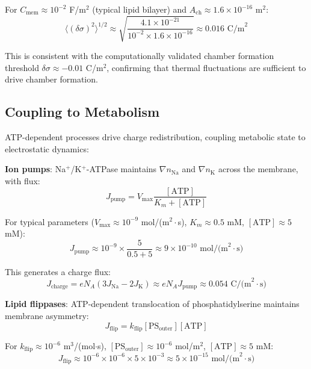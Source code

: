 \documentclass[twocolumn,10pt,aps,prd,superscriptaddress,floatfix,nofootinbib]{revtex4-2}
\theoremstyle{remark}
\begin{document}
For $C_{\mathrm{mem}} \approx 10^{-2}$ F/m$^2$ (typical lipid bilayer) and $A_{\mathrm{ch}} \approx 1.6 \times 10^{-16}$ m$^2$:
\begin{equation}
\langle(\delta\sigma)^2\rangle^{1/2} \approx \sqrt{\frac{4.1 \times 10^{-21}}{10^{-2} \times 1.6 \times 10^{-16}}} \approx 0.016 \text{ C/m}^2
\end{equation}

This is consistent with the computationally validated chamber formation threshold $\delta\sigma \approx -0.01$ C/m$^2$, confirming that thermal fluctuations are sufficient to drive chamber formation.

\subsection{Coupling to Metabolism}

ATP-dependent processes drive charge redistribution, coupling metabolic state to electrostatic dynamics:

\textbf{Ion pumps}: Na$^+$/K$^+$-ATPase maintains $\nabla n_{\mathrm{Na}}$ and $\nabla n_{\mathrm{K}}$ across the membrane, with flux:
\begin{equation}
J_{\mathrm{pump}} = V_{\mathrm{max}}\frac{[\mathrm{ATP}]}{K_m + [\mathrm{ATP}]}
\label{eq:pump_flux}
\end{equation}

For typical parameters ($V_{\mathrm{max}} \approx 10^{-9}$ mol/(m$^2 \cdot$s), $K_m \approx 0.5$ mM, $[\mathrm{ATP}] \approx 5$ mM):
\begin{equation}
J_{\mathrm{pump}} \approx 10^{-9} \times \frac{5}{0.5 + 5} \approx 9 \times 10^{-10} \text{ mol/(m}^2 \cdot \text{s)}
\end{equation}

This generates a charge flux:
\begin{equation}
J_{\mathrm{charge}} = e N_A (3 J_{\mathrm{Na}} - 2 J_{\mathrm{K}}) \approx e N_A J_{\mathrm{pump}} \approx 0.054 \text{ C/(m}^2 \cdot \text{s)}
\end{equation}

\textbf{Lipid flippases}: ATP-dependent translocation of phosphatidylserine maintains membrane asymmetry:
\begin{equation}
J_{\mathrm{flip}} = k_{\mathrm{flip}}[\mathrm{PS}_{\mathrm{outer}}][\mathrm{ATP}]
\label{eq:flippase_flux}
\end{equation}

For $k_{\mathrm{flip}} \approx 10^{-6}$ m$^3$/(mol$\cdot$s), $[\mathrm{PS}_{\mathrm{outer}}] \approx 10^{-6}$ mol/m$^2$, $[\mathrm{ATP}] \approx 5$ mM:
\begin{equation}
J_{\mathrm{flip}} \approx 10^{-6} \times 10^{-6} \times 5 \times 10^{-3} \approx 5 \times 10^{-15} \text{ mol/(m}^2 \cdot \text{s)}
\end{equation}
\end{document}
